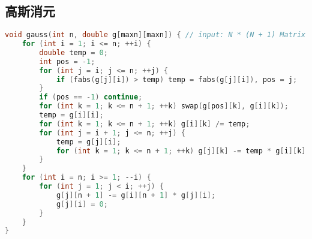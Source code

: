 \subsection{高斯消元}
\begin{lstlisting}[language=c++]
void gauss(int n, double g[maxn][maxn]) { // input: N * (N + 1) Matrix
	for (int i = 1; i <= n; ++i) {
		double temp = 0;
		int pos = -1;
		for (int j = i; j <= n; ++j) {
			if (fabs(g[j][i]) > temp) temp = fabs(g[j][i]), pos = j;
		}
		if (pos == -1) continue;
		for (int k = 1; k <= n + 1; ++k) swap(g[pos][k], g[i][k]);
		temp = g[i][i];
		for (int k = 1; k <= n + 1; ++k) g[i][k] /= temp;
		for (int j = i + 1; j <= n; ++j) {
			temp = g[j][i];
			for (int k = 1; k <= n + 1; ++k) g[j][k] -= temp * g[i][k];
		}
	}
	for (int i = n; i >= 1; --i) {
		for (int j = 1; j < i; ++j) {
			g[j][n + 1] -= g[i][n + 1] * g[j][i];
			g[j][i] = 0;
		}
	}
}
    \end{lstlisting}